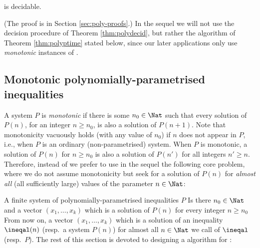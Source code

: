 \begin{theorem} \label{thm:polydecid}
\polyineqsolvname is decidable. %
\end{theorem}
%
\noindent
(The proof is in Section \ref{sec:poly-proofs}.)
In the sequel we will not use the decision procedure of Theorem \ref{thm:polydecid}, but rather the algorithm of Theorem \ref{thm:polyptime} stated below, since our
later applications only use \emph{monotonic} instances of \polyineqsolvname.


\subsection{Monotonic polynomially-parametrised inequalities}
\label{sec:poly-mon}

A system $P$ is \emph{monotonic} if there is some $n_0\in\Nat$ such that
every solution of $P(n)$, for an integer $n\geq n_0$, 
is also a solution of $P(n+1)$.
Note that monotonicity vacuously holds (with any value of $n_0$) 
if $n$ does not appear in $P$, i.e., when $P$ is an ordinary (non-parametrised) system.
When $P$ is monotonic, 
a solution of $P(n)$ for $n\geq n_0$ is also a solution of $P(n')$ for all integers $n'\geq n$.
%
%
Therefore, instead of \polyineqsolvname we prefer to use in the sequel
the following core problem, where we do not assume monotonicity but
seek for a solution of $P(n)$ for \emph{almost all} 
(all sufficiently large) values of the parameter $n\in\Nat$:

\prob{\allpolyineqsolvname}
{A finite system of polynomially-parametrised inequalities $P$} 
{Is there $n_0 \in \Nat$ and a vector $(x_1, \ldots, x_k)$ which is a solution of $P(n)$ for every integer $n\geq n_0$}
%
%
\noindent
From now on, a vector $(x_1, \ldots, x_k)$ which is a solution of an inequality $\ineqal(n)$ 
(resp.~a system $P(n)$) for almost all $n\in\Nat$ we call \emph{\aasol} of 
$\ineqal$ (resp.~$P$).
The rest of this section is devoted to designing a \PTIME algorithm for \allpolyineqsolvname:

